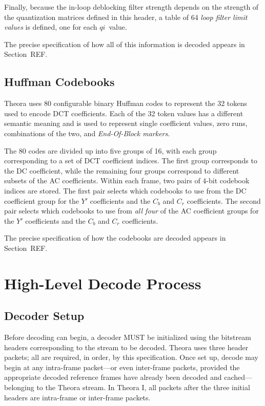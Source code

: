 \documentclass[11pt,letterpaper]{book}
\newcommand{\idx}[1]{{\ensuremath{\mathit{#1}}}}
\newcommand{\qi}{\idx{qi}}
\newcommand{\term}[1]{{\em #1}}
\numberwithin{equation}{chapter}
\numberwithin{figure}{chapter}
\numberwithin{table}{chapter}
\begin{document}
Finally, because the in-loop deblocking filter strength depends on the strength
 of the quantization matrices defined in this header, a table of 64 \term{loop
 filter limit values} is defined, one for each \qi\ value.

The precise specification of how all of this information is decoded appears in
 Section~REF.

\subsection{Huffman Codebooks}

Theora uses 80 configurable binary Huffman codes to represent the 32 tokens
 used to encode DCT coefficients.
Each of the 32 token values has a different semantic meaning and is used to
 represent single coefficient values, zero runs, combinations of the two, and
 \term{End-Of-Block markers}.

The 80 codes are divided up into five groups of 16, with each group
 corresponding to a set of DCT coefficient indices.
The first group corresponds to the DC coefficient, while the remaining four
 groups correspond to different subsets of the AC coefficients.
Within each frame, two pairs of 4-bit codebook indices are stored.
The first pair selects which codebooks to use from the DC coefficient group for
 the $Y'$ coefficients and the $C_b$ and $C_r$ coefficients.
The second pair selects which codebooks to use from {\em all four} of the AC
 coefficient groups for the $Y'$ coefficients and the $C_b$ and $C_r$
 coefficients.

The precise specification of how the codebooks are decoded appears in
 Section~REF.

\section{High-Level Decode Process}

\subsection{Decoder Setup}

Before decoding can begin, a decoder MUST be initialized using the bitstream
 headers corresponding to the stream to be decoded.
Theora uses three header packets; all are required, in order, by this
 specification.
Once set up, decode may begin at any intra-frame packet---or even inter-frame
 packets, provided the appropriate decoded reference frames have already been
 decoded and cached---belonging to the Theora stream.
In Theora I, all packets after the three initial headers are intra-frame or
 inter-frame packets.
\end{document}
